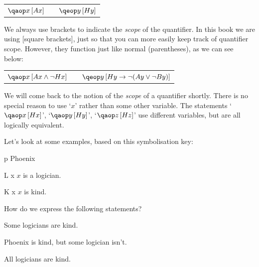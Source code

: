 \documentclass[PHIL101-Textbook.tex]{subfiles}
\begin{document}
\begin{center}
\begin{tabular}{lll}
$\qab{x}{\atom A x}$ & & $\qeb{y}{\atom H y}$
\end{tabular}
\end{center}

\noindent We always use brackets to indicate the \emph{scope} of the quantifier. In this book we are using [square brackets], just so that you can more easily keep track of quantifier scope. However, they function just like normal (parentheses), as we can see below:

\begin{center}
\begin{tabular}{lll}
$\qab{x}{\atom A x \land \lnot \atom H x}$ & & $\qeb{y}{H y \to \lnot(\atom A y \lor \lnot\atom B y)}$
\end{tabular}
\end{center}


\noindent We will come back to the notion of the \emph{scope} of a quantifier shortly. There is no special reason to use `$x$' rather than some other variable. The statements `$\qab{x}{\atom H x}$', `$\qab{y}{\atom H y}$', `$\qab{z}{\atom H z}$' use different variables, but are all logically equivalent.


Let's look at some examples, based on this symbolisation key: 

\begin{ekey}
\item[p] Phoenix
\item[\atom L x ] $x$ is a logician. 
\item[\atom K x ] $x$ is kind.
\end{ekey}



\noindent How do we express the following statements?

\begin{earg}
\item[\ex{q.en}] Some logicians are kind.
\item[\ex{q.ne}] Phoenix is kind, but some logician isn't.
\item[\ex{q.na}] All logicians are kind.
\end{earg}
\end{document}
